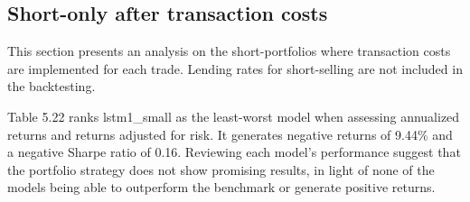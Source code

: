 \subsection{Short-only after transaction costs}
This section presents an analysis on the short-portfolios where transaction costs are implemented for each trade. Lending rates for short-selling are not included in the backtesting. 
\indent\newline
\begin{table}[ht]
\centering
{}
\caption{Small cap trading performance short-only w/t.cost (K=5)}
\end{table}
\indent\newline
Table 5.22 ranks lstm1\_small as the least-worst model when assessing annualized returns and returns adjusted for risk. It generates negative returns of 9.44\% and a negative Sharpe ratio of 0.16. Reviewing each model's performance suggest that the portfolio strategy does not show promising results, in light of none of the models being able to outperform the benchmark or generate positive returns.  
\indent\newline 
